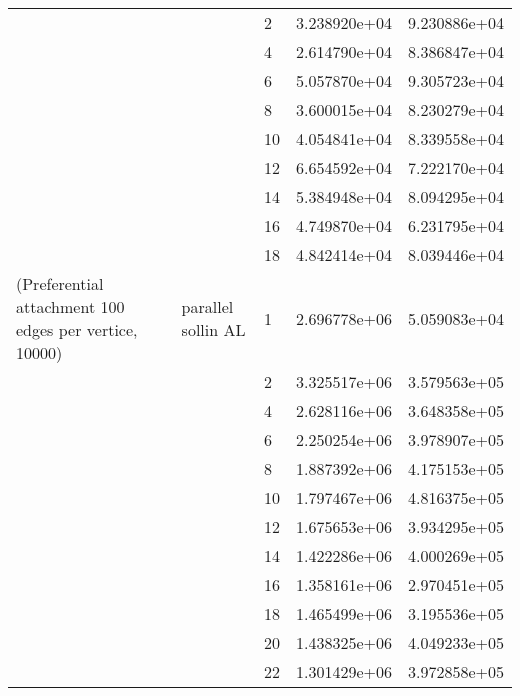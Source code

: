 \begin{tabular}{lllrr}
                      &                     & 2  &  3.238920e+04 &  9.230886e+04 \\
                      &                     & 4  &  2.614790e+04 &  8.386847e+04 \\
                      &                     & 6  &  5.057870e+04 &  9.305723e+04 \\
                      &                     & 8  &  3.600015e+04 &  8.230279e+04 \\
                      &                     & 10 &  4.054841e+04 &  8.339558e+04 \\
                      &                     & 12 &  6.654592e+04 &  7.222170e+04 \\
                      &                     & 14 &  5.384948e+04 &  8.094295e+04 \\
                      &                     & 16 &  4.749870e+04 &  6.231795e+04 \\
                      &                     & 18 &  4.842414e+04 &  8.039446e+04 \\
(Preferential attachment 100 edges per vertice, 10000) & parallel sollin AL & 1  &  2.696778e+06 &  5.059083e+04 \\
                      &                     & 2  &  3.325517e+06 &  3.579563e+05 \\
                      &                     & 4  &  2.628116e+06 &  3.648358e+05 \\
                      &                     & 6  &  2.250254e+06 &  3.978907e+05 \\
                      &                     & 8  &  1.887392e+06 &  4.175153e+05 \\
                      &                     & 10 &  1.797467e+06 &  4.816375e+05 \\
                      &                     & 12 &  1.675653e+06 &  3.934295e+05 \\
                      &                     & 14 &  1.422286e+06 &  4.000269e+05 \\
                      &                     & 16 &  1.358161e+06 &  2.970451e+05 \\
                      &                     & 18 &  1.465499e+06 &  3.195536e+05 \\
                      &                     & 20 &  1.438325e+06 &  4.049233e+05 \\
                      &                     & 22 &  1.301429e+06 &  3.972858e+05 \\

\end{tabular}
